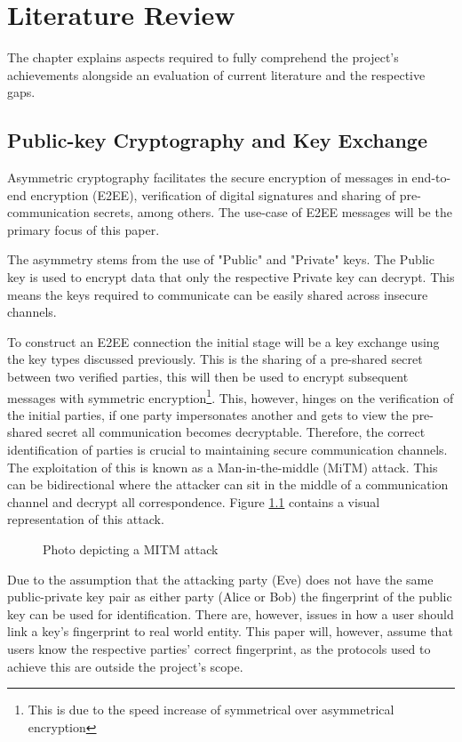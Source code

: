 \chapter{Literature Review}
\label{cha:LiteratureReview}

The chapter explains aspects required to fully comprehend the project's achievements alongside an evaluation of current literature and the respective gaps.

\section{Public-key Cryptography and Key Exchange}
Asymmetric cryptography facilitates the secure encryption of messages in end-to-end encryption (E2EE), verification of digital signatures and sharing of pre-communication secrets, among others. The use-case of E2EE messages will be the primary focus of this paper.

The asymmetry stems from the use of "Public" and "Private" keys. The Public key is used to encrypt data that only the respective Private key can decrypt. This means the keys required to communicate can be easily shared across insecure channels.

To construct an E2EE connection the initial stage will be a key exchange using the key types discussed previously. This is the sharing of a pre-shared secret between two verified parties, this will then be used to encrypt subsequent messages with symmetric encryption\footnote{This is due to the speed increase of symmetrical over asymmetrical encryption}. This, however, hinges on the verification of the initial parties, if one party impersonates another and gets to view the pre-shared secret all communication becomes decryptable. Therefore, the correct identification of parties is crucial to maintaining secure communication channels. The exploitation of this is known as a Man-in-the-middle (MiTM) attack. This can be bidirectional where the attacker can sit in the middle of a communication channel and decrypt all correspondence. Figure \ref{fig:mitm} contains a visual representation of this attack.

\begin{center}
    
    \begin{figure}[h]
        \caption{Photo depicting a MITM attack}
        \label{fig:mitm}
    \end{figure}
\end{center}

Due to the assumption that the attacking party (Eve) does not have the same public-private key pair as either party (Alice or Bob) the fingerprint of the public key can be used for identification. There are, however, issues in how a user should link a key's fingerprint to real world entity. This paper will, however, assume that users know the respective parties' correct fingerprint, as the protocols used to achieve this are outside the project's scope.

